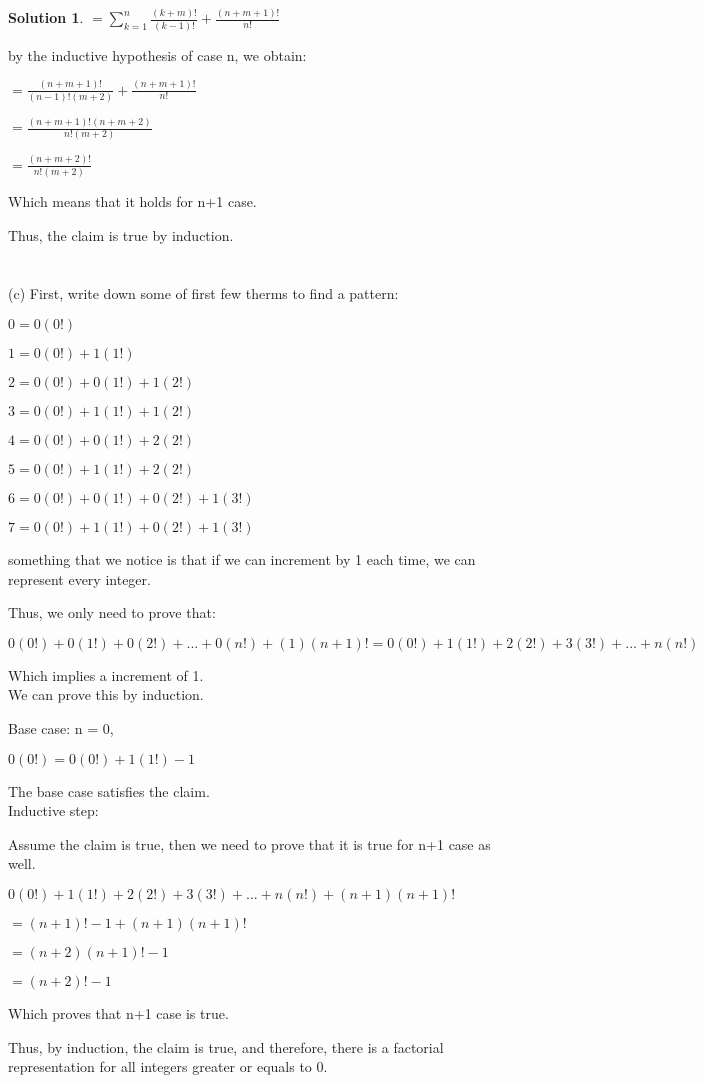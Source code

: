 \documentclass{article}
\theoremstyle{definition}
\newtheorem*{solution}{Solution}
\begin{document}
\begin{solution}
\(= \sum_{k=1}^{n}{\frac{(k+m)!}{(k-1)!}} + \frac{(n+m+1)!}{n!}\)

by the inductive hypothesis of case n, we obtain:

\(= \frac{(n+m+1)!}{(n-1)!(m+2)} + \frac{(n+m+1)!}{n!}\)

\(= \frac{(n+m+1)!(n+m+2)}{n!(m+2)}\)

\(= \frac{(n+m+2)!}{n!(m+2)}\)

Which means that it holds for n+1 case.

Thus, the claim is true by induction.\\\\\\


(c) First, write down some of first few therms to find a pattern:

\(0 = 0(0!)\)

\(1 = 0(0!) + 1(1!)\)

\(2 = 0(0!) + 0(1!) + 1(2!)\)

\(3 = 0(0!) + 1(1!) + 1(2!)\)

\(4 = 0(0!) + 0(1!) + 2(2!)\)

\(5 = 0(0!) + 1(1!) + 2(2!)\)

\(6 = 0(0!) + 0(1!) + 0(2!) + 1(3!)\)

\(7 = 0(0!) + 1(1!) + 0(2!) + 1(3!)\)

something that we notice is that if we can increment by 1 each time, we can represent every integer.

Thus, we only need to prove that:

 \(0(0!) + 0(1!) + 0(2!) + ... + 0(n!) + (1)(n+1)! = 0(0!) + 1(1!) + 2(2!) + 3(3!) + ... + n(n!)\)

Which implies a increment of 1.\\

We can prove this by induction.

Base case: n = 0,

\(0(0!) = 0(0!) + 1(1!) - 1\)

The base case satisfies the claim.\\

Inductive step:

Assume the claim is true, then we need to prove that it is true for n+1 case as well.

\(0(0!) + 1(1!) + 2(2!) + 3(3!) + ... + n(n!) + (n+1)(n+1)!\)

\(= (n+1)! -1 + (n+1)(n+1)!\)

\(= (n+2)(n+1)! - 1\)

\(= (n+2)! - 1\)

Which proves that n+1 case is true.

Thus, by induction, the claim is true, and therefore, there is a factorial representation for all integers greater or equals to 0.\\\\\\


\end{solution}
\end{document}
